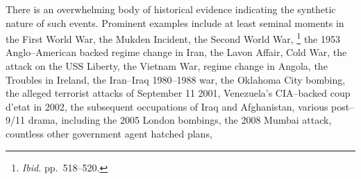 There is an overwhelming body of historical evidence indicating the synthetic nature of such events. Prominent examples include at least seminal moments in the First World War,
the Mukden Incident,
the Second World War,
\footnotecite[extras={ p.~193.}][shirer1960]\footnote{{\it Ibid.} pp.~518--520.} %
the 1953 Anglo--American backed regime change in Iran,
\footnotecite[gasiorowski2000] %
the Lavon Affair,
Cold War,
\footnotecite[northwoods]
the attack on the USS Liberty,
the Vietnam War,
\footnotecite[bumiller2010] %
regime change in Angola,
the Troubles in Ireland,
the Iran--Iraq 1980--1988 war,
the Oklahoma City bombing,
the alleged terrorist attacks of September 11 2001, %
\footnotecite[gourley2012] 
\footnotecite[harrit2009]
Venezuela's CIA--backed coup d'etat in 2002, %
the subsequent occupations of Iraq %
and Afghanistan, %
\footnotecite[extras={ p.~74.}][grad2009]
various post--9/11 drama, %
\footnotecite[king2010]
including the 2005 London bombings, %
\footnotecite[secker2010] 
the 2008 Mumbai attack, %
countless other government agent hatched plans, %
